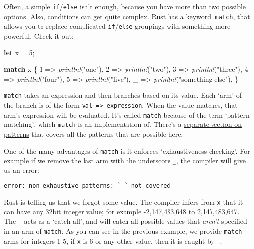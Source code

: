 \documentclass[a4paper,]{book}
\newenvironment{Shaded}{\begin{snugshade}}{\end{snugshade}}
\newcommand{\KeywordTok}[1]{\textcolor[rgb]{0.13,0.29,0.53}{\textbf{{#1}}}}
\newcommand{\DecValTok}[1]{\textcolor[rgb]{0.00,0.00,0.81}{{#1}}}
\newcommand{\StringTok}[1]{\textcolor[rgb]{0.31,0.60,0.02}{{#1}}}
\newcommand{\PreprocessorTok}[1]{\textcolor[rgb]{0.56,0.35,0.01}{\textit{{#1}}}}
\newcommand{\NormalTok}[1]{{#1}}
\begin{document}
Often, a simple \protect\hyperlink{sec--if}{\texttt{if}}/\texttt{else}
isn't enough, because you have more than two possible options. Also,
conditions can get quite complex. Rust has a keyword, \texttt{match},
that allows you to replace complicated \texttt{if}/\texttt{else}
groupings with something more powerful. Check it out:

\begin{Shaded}
\begin{Highlighting}[]
\KeywordTok{let} \NormalTok{x = }\DecValTok{5}\NormalTok{;}

\KeywordTok{match} \NormalTok{x \{}
    \DecValTok{1} \NormalTok{=> }\PreprocessorTok{println!}\NormalTok{(}\StringTok{"one"}\NormalTok{),}
    \DecValTok{2} \NormalTok{=> }\PreprocessorTok{println!}\NormalTok{(}\StringTok{"two"}\NormalTok{),}
    \DecValTok{3} \NormalTok{=> }\PreprocessorTok{println!}\NormalTok{(}\StringTok{"three"}\NormalTok{),}
    \DecValTok{4} \NormalTok{=> }\PreprocessorTok{println!}\NormalTok{(}\StringTok{"four"}\NormalTok{),}
    \DecValTok{5} \NormalTok{=> }\PreprocessorTok{println!}\NormalTok{(}\StringTok{"five"}\NormalTok{),}
    \NormalTok{_ => }\PreprocessorTok{println!}\NormalTok{(}\StringTok{"something else"}\NormalTok{),}
\NormalTok{\}}
\end{Highlighting}
\end{Shaded}

\texttt{match} takes an expression and then branches based on its value.
Each `arm' of the branch is of the form
\texttt{val\ =\textgreater{}\ expression}. When the value matches, that
arm's expression will be evaluated. It's called \texttt{match} because
of the term `pattern matching', which \texttt{match} is an
implementation of. There's a \protect\hyperlink{sec--patterns}{separate
section on patterns} that covers all the patterns that are possible
here.

One of the many advantages of \texttt{match} is it enforces
`exhaustiveness checking'. For example if we remove the last arm with
the underscore \texttt{\_}, the compiler will give us an error:

\begin{verbatim}
error: non-exhaustive patterns: `_` not covered
\end{verbatim}

Rust is telling us that we forgot some value. The compiler infers from
\texttt{x} that it can have any 32bit integer value; for example
-2,147,483,648 to 2,147,483,647. The \texttt{\_} acts as a `catch-all',
and will catch all possible values that \emph{aren't} specified in an
arm of \texttt{match}. As you can see in the previous example, we
provide \texttt{match} arms for integers 1-5, if \texttt{x} is 6 or any
other value, then it is caught by \texttt{\_}.
\end{document}

